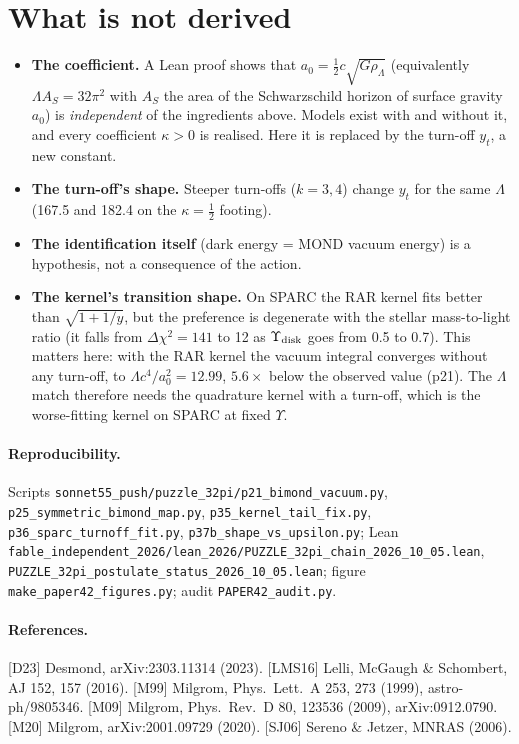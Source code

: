 \documentclass[10pt]{article}
\newcommand{\fpath}[1]{\nolinkurl{#1}}
\begin{document}
\section{What is not derived}
\begin{itemize}
\item \textbf{The coefficient.} A Lean proof shows that $a_0=\tfrac12c\sqrt{G\rho_\Lambda}$ (equivalently $\Lambda A_S=32\pi^2$ with $A_S$ the area of the Schwarzschild horizon of surface gravity $a_0$) is \emph{independent} of the ingredients above. Models exist with and without it, and every coefficient $\kappa>0$ is realised. Here it is replaced by the turn-off $y_t$, a new constant.
\item \textbf{The turn-off's shape.} Steeper turn-offs ($k=3,4$) change $y_t$ for the same $\Lambda$ (167.5 and 182.4 on the $\kappa=\tfrac12$ footing).
\item \textbf{The identification itself} (dark energy = MOND vacuum energy) is a hypothesis, not a consequence of the action.
\item \textbf{The kernel's transition shape.} On SPARC the RAR kernel fits better than $\sqrt{1+1/y}$, but the preference is degenerate with the stellar mass-to-light ratio (it falls from $\Delta\chi^2=141$ to 12 as $\Upsilon_{\rm disk}$ goes from 0.5 to 0.7). This matters here: with the RAR kernel the vacuum integral converges without any turn-off, to $\Lambda c^4/a_0^2=12.99$, $5.6\times$ below the observed value (p21). The $\Lambda$ match therefore needs the quadrature kernel with a turn-off, which is the worse-fitting kernel on SPARC at fixed $\Upsilon$.
\end{itemize}

\paragraph{Reproducibility.} Scripts \fpath{sonnet55_push/puzzle_32pi/p21_bimond_vacuum.py}, \fpath{p25_symmetric_bimond_map.py}, \fpath{p35_kernel_tail_fix.py}, \fpath{p36_sparc_turnoff_fit.py}, \fpath{p37b_shape_vs_upsilon.py}; Lean \fpath{fable_independent_2026/lean_2026/PUZZLE_32pi_chain_2026_10_05.lean}, \fpath{PUZZLE_32pi_postulate_status_2026_10_05.lean}; figure \fpath{make_paper42_figures.py}; audit \fpath{PAPER42_audit.py}.

\small
\paragraph{References.}
[D23] Desmond, arXiv:2303.11314 (2023).
[LMS16] Lelli, McGaugh \& Schombert, AJ 152, 157 (2016).
[M99] Milgrom, Phys.\ Lett.\ A 253, 273 (1999), astro-ph/9805346.
[M09] Milgrom, Phys.\ Rev.\ D 80, 123536 (2009), arXiv:0912.0790.
[M20] Milgrom, arXiv:2001.09729 (2020).
[SJ06] Sereno \& Jetzer, MNRAS (2006).
\end{document}
